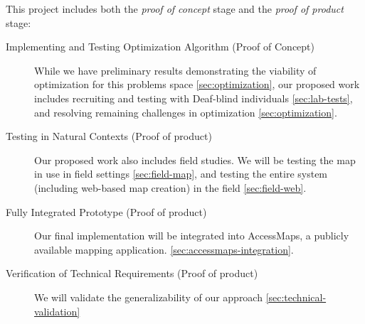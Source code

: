 
This project includes both the \textit{proof of concept} stage and the \textit{proof of product} stage:
\begin{description}
\item[Implementing and Testing Optimization Algorithm (Proof of Concept)] While we have preliminary results demonstrating the viability of optimization for this problems space \ref{sec:optimization}, our proposed work includes recruiting and testing with Deaf-blind individuals \ref{sec:lab-tests}, and resolving remaining challenges in optimization \ref{sec:optimization}.
\item[Testing in Natural Contexts (Proof of product)] Our proposed work also includes field studies. We will be testing the map in use in field settings \ref{sec:field-map}, and testing the entire system (including web-based map creation) in the field \ref{sec:field-web}. 
\item[Fully Integrated Prototype (Proof of product)]
Our final implementation will be integrated into AccessMaps, a publicly available mapping application. \ref{sec:accessmaps-integration}.
\item[Verification of Technical Requirements (Proof of product)]
We will validate the generalizability of our approach  \ref{sec:technical-validation}
\end{description}

